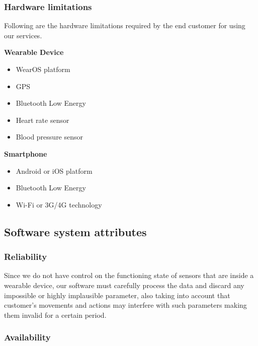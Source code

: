 \documentclass[../main.tex]{subfiles}
\begin{document}
\subsubsection{Hardware limitations}

Following are the hardware limitations required by the end customer for using our services.

\vspace*{8mm}
\begin{minipage}{\textwidth}
{\bf Wearable Device}
\begin{itemize}
	\item WearOS platform
	\item GPS
	\item Bluetooth Low Energy
	\item Heart rate sensor
	\item Blood pressure sensor
\end{itemize}
\end{minipage}

\vspace*{8mm}
\begin{minipage}{\textwidth}
{\bf Smartphone}
\begin{itemize}
	\item Android or iOS platform
	\item Bluetooth Low Energy
	\item Wi-Fi or 3G/4G technology
\end{itemize}
\end{minipage}

\subsection{Software system attributes}

\subsubsection{Reliability}

Since we do not have control on the functioning state of sensors that are inside a wearable device, our software must carefully process the data and discard any impossible or highly implausible parameter, also taking into account that customer's movements and actions may interfere with such parameters making them invalid for a certain period.

\subsubsection{Availability}
\end{document}
